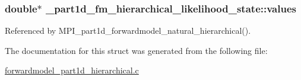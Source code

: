 \subsubsection[{\texorpdfstring{values}{values}}]{\setlength{\rightskip}{0pt plus 5cm}double$\ast$ \+\_\+part1d\+\_\+fm\+\_\+hierarchical\+\_\+likelihood\+\_\+state\+::values}\hypertarget{struct__part1d__fm__hierarchical__likelihood__state_a5ae0d97a1f21f2b937ccb661f61b55ce}{}\label{struct__part1d__fm__hierarchical__likelihood__state_a5ae0d97a1f21f2b937ccb661f61b55ce}


Referenced by M\+P\+I\+\_\+part1d\+\_\+forwardmodel\+\_\+natural\+\_\+hierarchical().



The documentation for this struct was generated from the following file\+:\begin{DoxyCompactItemize}
\item 
\hyperlink{forwardmodel__part1d__hierarchical_8c}{forwardmodel\+\_\+part1d\+\_\+hierarchical.\+c}\end{DoxyCompactItemize}
